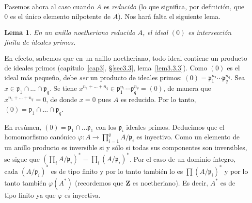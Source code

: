 \documentclass[bibtotoc,leqno,spanish]{amsbook}
\newcommand{\ZZ}{\mathbf{Z}}
\newcommand{\idl}[1]{\mathfrak{#1}}
\renewcommand{\to}[1][]{\xrightarrow{#1}}
\numberwithin{equation}{section}
\theoremstyle{note}
\theoremstyle{note}
\newtheorem*{lemma*}{Lema}
\theoremstyle{rem}
\numberwithin{theorem}{section}
\numberwithin{proposition}{section}
\numberwithin{definition}{section}
\numberwithin{lemma}{section}
\numberwithin{corollary}{section}
\numberwithin{example}{section}
\numberwithin{footnote}{section}%
\begin{document}
Pasemos ahora al caso cuando $A$ es {\em reducido} (lo que significa, por definici\'on, que $0$ es el
\'unico elemento nilpotente de $A$). Nos har\'a falta el siguiente lema.

\begin{lemma*}
En un anillo noetheriano reducido $A$, el ideal $(0)$ es intersecci\'on finita de ideales primos.
\end{lemma*}

En efecto, sabemos que en un anillo noetheriano, todo ideal contiene un producto de ideales primos
(cap\'itulo~\ref{cap3}, \S\ref{sec3.3}, lema~\ref{lem3.3.3}).
Como $(0)$ es el ideal m\'as peque\~no, debe {\em ser} un producto de ideales primos:
$(0) = \idl{p}_{1}^{n_{1}}\cdots\idl{p}_{q}^{n_{q}}$. Sea $x\in\idl{p}_{1}\cap\dots\cap\idl{p}_{q}$. Se
tiene $x^{n_{1}+\dots+n_{q}}\in\idl{p}_{1}^{n_{1}}\cdots\idl{p}_{q}^{n_{q}} = (0)$, de manera que
$x^{n_{1}+\dots+n_{q}}=0$, de donde $x = 0$ pues $A$ es reducido. Por lo tanto, $(0) = \idl{p}_{1}\cap\dots\cap\idl{p}_{q}$.

En res\'umen, $(0) = \idl{p}_{1}\cap\dots\idl{p}_{1}$ con los $\idl{p}_{i}$ ideales primos. Deducimos que
el homomorfismo can\'onico $\varphi:A\to\prod_{i=1}^{q}A/\idl{p}_{i}$ es inyectivo. Como un elemento de un anillo
producto es inversible si y s\'olo si todas sus componentes son inversibles, se sigue que
$\left(\prod_{i}A/\idl{p}_{i}\right)^{*}=\prod_{i}(A/\idl{p}_{i})^{*}$. Por el caso de un dominio \'integro, cada
$(A/\idl{p}_{i})^{*}$ es de tipo finito y por lo tanto tambi\'en lo es $\prod(A/\idl{p}_{i})^{*}$ y por lo tanto
tambi\'en $\varphi(A^{*})$ (recordemos que $\ZZ$ es noetheriano). Es decir, $A^{*}$ es de tipo finito ya que
$\varphi$ es inyectiva.
\end{document}
